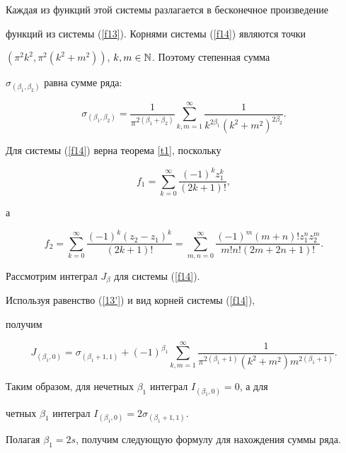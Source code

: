 Каждая из функций этой системы разлагается в бесконечное произведение 


функций из системы (\ref{f13}). Корнями системы (\ref{f14}) являются точки


$(\pi^2k^2,\pi^2(k^2+m^2))$, $k,m\in\Bbb N$. Поэтому степенная сумма


$\sigma_{(\beta_1,\beta_2)}$ равна сумме ряда:


$$


\sigma_{(\beta_1,\beta_2)}=\frac 1{\pi^{2(\beta_1+\beta_2)}}


\sum_{k,m=1}^\infty


\frac 1{k^{2\beta_1}(k^2+m^2)^{2\beta_2}}.


$$


Для системы (\ref{f14}) верна теорема \ref{t1}, поскольку


$$


f_1=\sum_{k=0}^\infty\frac {(-1)^k z_1^k}{(2k+1)!},


$$


а


$$


f_2=\sum_{k=0}^\infty\frac {(-1)^k (z_2-z_1)^k}{(2k+1)!}=


\sum_{m,n=0}^\infty\frac {(-1)^m (m+n)! z_1^n z_2^m}{m!n!(2m+2n+1)!}.


$$





Рассмотрим интеграл $J_\beta$ для системы (\ref{f14}).


Используя равенство (\ref{13'}) и вид корней системы (\ref{f14}), 


получим


$$


J_{(\beta_1,0)}=\sigma_{(\beta_1+1,1)}+(-1)^{\beta_1}


\sum_{k,m=1}^\infty\frac


1{ \pi^{2(\beta_1+1)}(k^2+m^2)m^{2(\beta_1+1)}}.


$$


Таким образом, для нечетных $\beta_1$ интеграл $I_{(\beta_1,0)}=0$, а для


четных $\beta_1$ интеграл $I_{(\beta_1,0)}=2\sigma_{(\beta_1+1,1)}$.


Полагая $\beta_1=2s$, получим следующую формулу для нахождения суммы ряда.








